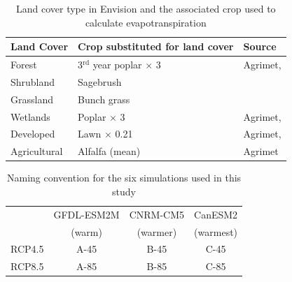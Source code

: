 \documentclass[water,article,submit,moreauthors,pdftex,10pt,a4paper]{mdpi}
\theoremstyle{mdpi}
\newcounter{re}
\theoremstyle{mdpidefinition}
\begin{document}
\begin{table}
\caption{Land cover type in Envision and the associated crop used to calculate evapotranspiration}
\label{table:LandCoverType}
\centering
\begin{tabular}{l l l}
\hline\hline
Land Cover & Crop substituted for land cover & Source \\
\hline
Forest & 3${}^{\mathrm{rd}}$ year poplar $\times$ 3 & Agrimet, \citet{Inouye:2014ws} \\
Shrubland & Sagebrush & \citet{Allen:2007ta} \\
Grassland & Bunch grass & \citet{Allen:2007ta} \\
Wetlands & Poplar $\times$ 3 & Agrimet, \citet{Inouye:2014ws} \\
Developed & Lawn $\times$ 0.21 & Agrimet, \citet{Inouye:2014ws} \\
Agricultural & Alfalfa (mean) & Agrimet \\
\hline\hline
\end{tabular}
\end{table}
\clearpage

\begin{table}
\caption{Naming convention for the six simulations used in this study}
\label{table:ExperimentDesign}
\centering
\begin{tabular}{c c c c}
\hline\hline
 & GFDL-ESM2M & CNRM-CM5 & CanESM2 \\
 & (warm) & (warmer) & (warmest) \\
\hline
RCP4.5 & A-45 & B-45 & C-45 \\
RCP8.5 & A-85 & B-85 & C-85 \\
\hline
\hline
\end{tabular}
\end{table}
\clearpage
\end{document}
